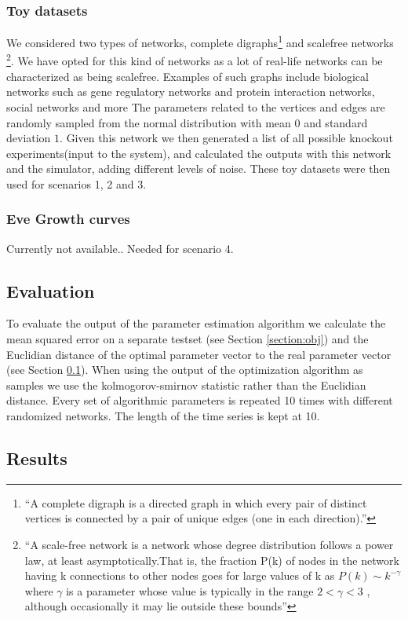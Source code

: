  \subsubsection{Toy datasets}
 We considered two types of networks, complete digraphs\footnote{``A complete digraph is a directed graph in which every pair of distinct vertices is connected by a pair of unique edges (one in each direction).''} and scalefree networks
\footnote{``A scale-free network is a network whose degree distribution follows a power law, at least asymptotically.That is, the fraction P(k) of nodes in the network having k connections to other nodes goes for large values of k as 
$ P(k) \sim k^{-\gamma} $ where $\gamma$ is a parameter whose value is typically in the range $2 < \gamma < 3$ \cite{barabasi2004network}, although occasionally it may lie outside these bounds''}. We have opted for this
kind of networks as a lot of real-life networks can be characterized as being scalefree. Examples of such graphs include biological networks such as gene regulatory networks and protein interaction networks, social networks and more \cite{barabasi2009scale}
The parameters related to the vertices and edges are randomly sampled from the normal distribution with mean $0$ and standard deviation $1$. Given this network we then generated a list of all possible knockout experiments(input to the system), and
calculated the outputs with this network and the simulator, adding different levels of noise. These toy datasets were then used for scenarios 1, 2 and 3.
 \subsubsection{Eve Growth curves}
 Currently not available.. Needed for scenario 4.
 \subsection{Evaluation}\label{sec:eval} 
To evaluate the output of the parameter estimation algorithm we calculate the mean squared error on a separate testset (see Section \ref{section:obj}) and the Euclidian distance of the optimal
parameter vector to the real parameter vector (see Section \ref{sec:eval}). When using the output of the optimization algorithm as samples we use the kolmogorov-smirnov statistic rather than
the Euclidian distance.
Every set of algorithmic parameters is repeated 10 times with different randomized networks. The length of the time series is kept at 10.


\subsection{Results}
